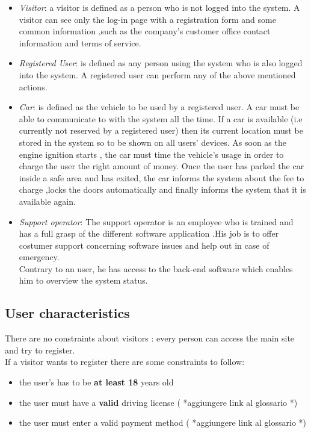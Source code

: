 \documentclass[12pt]{article}
\begin{document}
	\begin{itemize}
 	 	\item \textit{Visitor}: a visitor is defined as a person who is not logged into the system. A visitor can see only the log-in page with a registration form and some common information ,such as the company's customer office contact information and terms of service.
  		\item \textit{Registered User}: is defined as any person using the system who is also logged into the system. A registered user can perform any of the above mentioned actions.
  		\item \textit{Car}: is defined as the vehicle to be used by a registered user. A car must be able to communicate to with the system all the time. If a car is available (i.e currently not reserved by a registered user) then its current location must be stored in the system so to be shown on all users' devices. As soon as the engine ignition starts , the car must time the vehicle's usage in order to charge the user the right amount of money. Once the user has parked the car inside a safe area and has exited, the car informs the system about the fee to charge ,locks the doors automatically and finally informs the system that it is available again.
  		\item \textit{Support operator}: The support operator is an employee who is trained and has a full grasp of the different software application .His job is to offer costumer support concerning software issues and help out in case of emergency.\\ Contrary to an user, he has access to the back-end software which enables him to overview the system status.
  		 
	\end{itemize}
	
	\subsection{User characteristics}
	There are no constraints about visitors : every person can access the main site and try to register.\\If a visitor wants to register there are some constraints to follow: 
	\begin{itemize}
		\item the user's has to be \textbf{at least 18} years old
		\item the user must have a \textbf{valid} driving license ( *aggiungere link al glossario *)
		\item the user must enter a valid payment method ( *aggiungere link al glossario *)
	\end{itemize}
	
\end{document}
